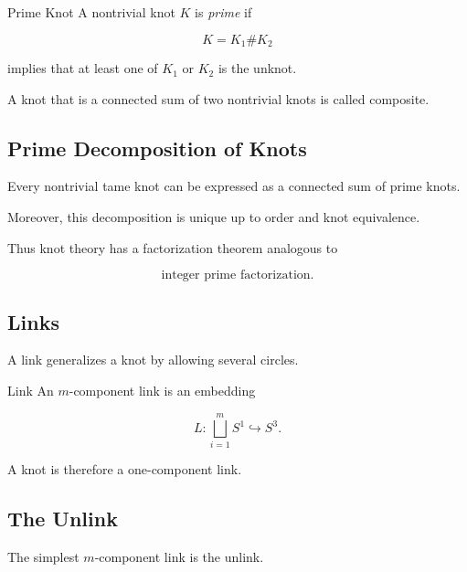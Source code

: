 \begin{definitionbox}{Prime Knot}
A nontrivial knot \(K\) is \emph{prime} if

\[
K=K_1\#K_2
\]

implies that at least one of \(K_1\) or \(K_2\) is the unknot.
\end{definitionbox}

A knot that is a connected sum of two nontrivial knots is called composite.

\subsection{Prime Decomposition of Knots}
\label{subsec:prime-decomposition-knots}

Every nontrivial tame knot can be expressed as a connected sum of prime
knots.

Moreover, this decomposition is unique up to order and knot equivalence.

Thus knot theory has a factorization theorem analogous to

\[
\boxed{
\text{integer prime factorization}.
}
\]

\subsection{Links}
\label{subsec:links}

A link generalizes a knot by allowing several circles.

\begin{definitionbox}{Link}
An \(m\)-component link is an embedding

\[
\boxed{
L:
\bigsqcup_{i=1}^{m}S^1
\hookrightarrow
S^3.
}
\]
\end{definitionbox}

A knot is therefore a one-component link.

\subsection{The Unlink}
\label{subsec:unlink}

The simplest \(m\)-component link is the unlink.

